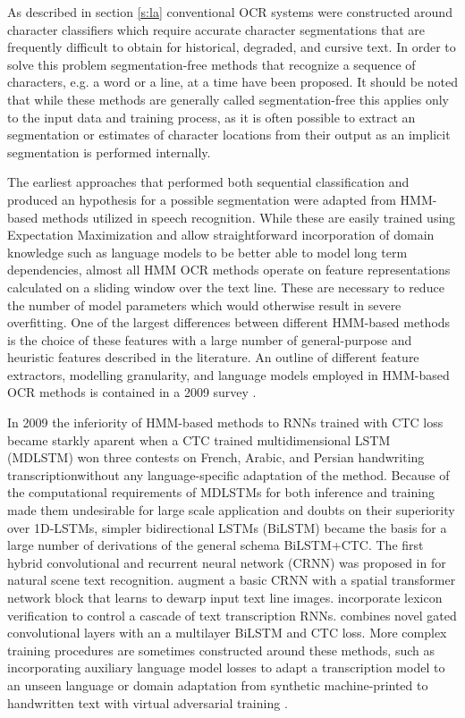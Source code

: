 As described in section \ref{s:la} conventional OCR systems were constructed
around character classifiers which require accurate character segmentations
that are frequently difficult to obtain for historical, degraded, and cursive
text. In order to solve this problem segmentation-free methods that recognize a
sequence of characters, e.g. a word or a line, at a time have been proposed. It
should be noted that while these methods are generally called segmentation-free
this applies only to the input data and training process, as it is often
possible to extract an segmentation or estimates of character locations from
their output as an implicit segmentation is performed internally.

The earliest approaches that performed both sequential classification and
produced an hypothesis for a possible segmentation were adapted from HMM-based
methods utilized in speech
recognition\cite{kaltenmeier1993sophisticated,rigoll1996comparison}. While
these are easily trained using Expectation Maximization and allow
straightforward incorporation of domain knowledge such as language models to be
better able to model long term dependencies, almost all HMM OCR methods operate
on feature representations calculated on a sliding window over the text line.
These are necessary to reduce the number of model parameters which would
otherwise result in severe overfitting. One of the largest differences between
different HMM-based methods is the choice of these features with a large number
of general-purpose and heuristic features described in the literature. An
outline of different feature extractors, modelling granularity, and language
models employed in HMM-based OCR methods is contained in a 2009 survey
\cite{plotz2009markov}.

In 2009 the inferiority of HMM-based methods to RNNs trained with CTC loss
became starkly aparent when a CTC trained multidimensional LSTM (MDLSTM)
\cite{graves2008offline} won three contests on French, Arabic, and Persian
handwriting transcriptionwithout any language-specific adaptation of the method.
Because of the computational requirements of MDLSTMs for both inference and
training made them undesirable for large scale application and doubts on their
superiority over 1D-LSTMs\cite{puigcerver2017multidimensional}, simpler
bidirectional LSTMs (BiLSTM) \cite{graves2008novel} became the basis for a
large number of derivations of the general schema BiLSTM+CTC. The first hybrid
convolutional and recurrent neural network (CRNN) was proposed in
\cite{shi2016end} for natural scene text recognition. \cite{dutta2018improving}
augment a basic CRNN with a spatial transformer network block that learns to
dewarp input text line images. \cite{stuner2016cohort} incorporate lexicon
verification to control a cascade of text transcription RNNs.
\cite{bluche2017gated} combines novel gated convolutional layers with an a
multilayer BiLSTM and CTC loss. More complex training procedures are sometimes
constructed around these methods, such as incorporating auxiliary language
model losses to adapt a transcription model to an unseen language
\cite{tensmeyer2018language} or domain adaptation from synthetic
machine-printed to handwritten text with virtual adversarial training
\cite{keret2019transductive}.

